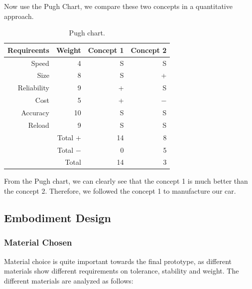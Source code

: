 \documentclass{article}
\begin{document}
\par Now use the Pugh Chart, we compare these two concepts in a quantitative approach.\\

\begin{table}[H]
\centering
\begin{tabular}{rrrr}
Requireents &     Weight &  Concept 1 &  Concept 2 \\
\hline
    Speed  &          4 &          S &          S \\

      Size &          8 &          S &          + \\

Reliability &          9 &          + &          S \\

      Cost &          5 &          + &          $-$ \\

  Accuracy &         10 &          S &          S \\

    Reload &          9 &          S &          S \\
\hline
\multicolumn{ 1}{c}{} &    Total $+$ &         14 &          8 \\

\multicolumn{ 1}{c}{} &    Total $-$ &          0 &          5 \\

\multicolumn{ 1}{c}{} &      Total &         14 &         3 \\
\end{tabular} 
\caption{Pugh chart.}
\end{table}

\par From the Pugh chart, we can clearly see that the concept 1 is much better than the concept 2. Therefore, we followed the concept 1 to manufacture our car.


\subsection{Embodiment Design}
\subsubsection*{Material Chosen}
\par Material choice is quite important towards the final prototype, as different materials show different requirements on tolerance, stability and weight. The different materials are analyzed as follows:
\end{document}
